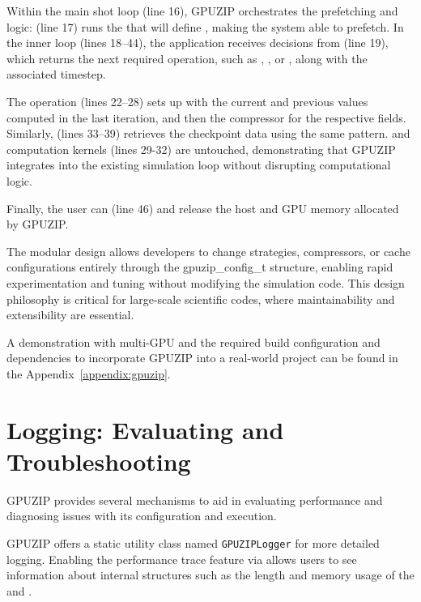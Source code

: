 \documentclass[Ingles,Final]{ic-tese-v3}
\begin{document}
Within the main shot loop (line 16), GPUZIP orchestrates the prefetching and \checkpointing logic:  (line 17) runs the \psa that will define \pav, making the system able to prefetch. In the inner loop (lines 18–44), the application receives \checkpointing decisions from  (line 19), which returns the next required operation, such as \save, \restore, \fwd or \bwd, along with the associated timestep.

The \save operation (lines 22–28) sets up  with the current and previous values computed in the last iteration, and then the compressor for the respective fields. Similarly, \restore (lines 33–39) retrieves the checkpoint data using the same pattern. \fwd and \bwd computation kernels (lines 29-32) are untouched, demonstrating that GPUZIP integrates into the existing simulation loop without disrupting computational logic.

Finally, the user can  (line 46) and release the host and GPU memory allocated by GPUZIP.

The modular design allows developers to change \checkpointing strategies, compressors, or cache configurations entirely through the gpuzip\_config\_t structure, enabling rapid experimentation and tuning without modifying the simulation code. This design philosophy is critical for large-scale scientific codes, where maintainability and extensibility are essential.

A demonstration with multi-GPU and the required build configuration and dependencies to incorporate GPUZIP into a real-world project can be found in the Appendix~\ref{appendix:gpuzip}.

\section{Logging: Evaluating and Troubleshooting}
\label{sec:osslog}

GPUZIP provides several mechanisms to aid in evaluating performance and diagnosing issues with its configuration and execution.

GPUZIP offers a static utility class named \texttt{GPUZIPLogger} for more detailed logging. Enabling the performance trace feature via  allows users to see information about internal structures such as the length and memory usage of the \cache and \pool.
\end{document}

